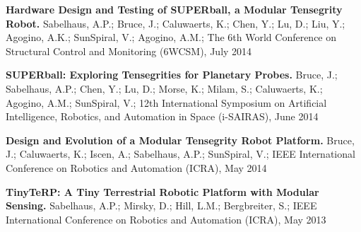 \documentclass[letterpaper]{deedy-resume} %
\begin{document}
\begin{minipage}[t]{1\textwidth}
\begin{tightitemize}
\item \textbf{Hardware Design and Testing of SUPERball, a Modular Tensegrity Robot.} Sabelhaus, A.P.; Bruce, J.; Caluwaerts, K.; Chen, Y.; Lu, D.; Liu, Y.; Agogino, A.K.; SunSpiral, V.; Agogino, A.M.; The 6th World Conference on Structural Control and Monitoring (6WCSM), July 2014

\item \textbf{SUPERball: Exploring Tensegrities for Planetary Probes.} Bruce, J.; Sabelhaus, A.P.; Chen, Y.; Lu, D.; Morse, K.; Milam, S.; Caluwaerts, K.; Agogino, A.M.; SunSpiral, V.; 12th International Symposium on Artificial Intelligence, Robotics, and Automation in Space (i-SAIRAS), June 2014

\item \textbf{Design and Evolution of a Modular Tensegrity Robot Platform.} Bruce, J.; Caluwaerts, K.; Iscen, A.; Sabelhaus, A.P.; SunSpiral, V.; IEEE International Conference on Robotics and Automation (ICRA), May 2014

\item \textbf{TinyTeRP: A Tiny Terrestrial Robotic Platform with Modular Sensing.} Sabelhaus, A.P.; Mirsky, D.; Hill, L.M.; Bergbreiter, S.; IEEE International Conference on Robotics and Automation (ICRA), May 2013 

\end{tightitemize}


\end{minipage}%
\newpage %
\end{document}
